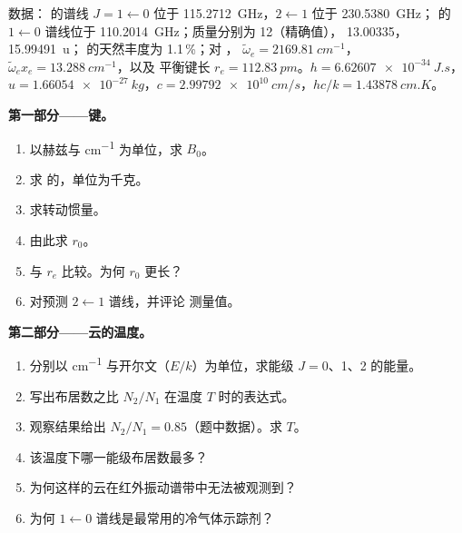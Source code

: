\begin{problem}
\label{pb:b3:rovibrational-spectroscopy:1}
数据： 的谱线 $J = 1 \leftarrow 0$ 位于 \qty{115.2712}{GHz}，$2
\leftarrow 1$ 位于 \qty{230.5380}{GHz}； 的 $1 \leftarrow 0$ 谱线位于
\qty{110.2014}{GHz}；质量分别为  12（精确值）， 13.00335，
 \qty{15.99491}{u}； 的天然丰度为 1.1\,\%；对 ，
$\tilde\omega_e = \qty{2169.81}{cm^{-1}}$，$\tilde\omega_ex_e = \qty{13.288}{cm^{-1}}$，以及
平衡键长 $r_e = \qty{112.83}{pm}$。$h = \qty{6.62607e-34}{J.s}$，$u =
\qty{1.66054e-27}{kg}$，$c = \qty{2.99792e10}{cm/s}$，$hc/k = \qty{1.43878}{cm.K}$。

\medskip\noindent\textbf{第一部分——键。}
\begin{enumerate}
  \item 以赫兹与 \unit{cm^{-1}} 为单位，求 $B_0$。
  \item 求  的，单位为千克。
  \item 求转动惯量。
  \item 由此求 $r_0$。
  \item 与 $r_e$ 比较。为何 $r_0$ 更长？
  \item 对预测 $2 \leftarrow 1$ 谱线，并评论
        测量值。
\end{enumerate}

\medskip\noindent\textbf{第二部分——云的温度。}
\begin{enumerate}[resume]
  \item 分别以 \unit{cm^{-1}} 与开尔文（$E/k$）为单位，求能级 $J =
        0$、1、2 的能量。
  \item 写出布居数之比 $N_2/N_1$ 在温度 $T$ 时的表达式。
  \item 观察结果给出 $N_2/N_1 = 0.85$（题中数据）。求 $T$。
  \item 该温度下哪一能级布居数最多？
  \item 为何这样的云在红外振动谱带中无法被观测到？
  \item 为何 $1 \leftarrow 0$ 谱线是最常用的冷气体示踪剂？
\end{enumerate}


\end{problem}
